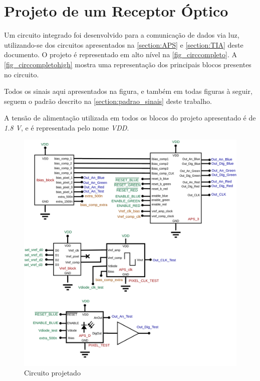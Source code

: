 \section[Projeto de um Receptor Óptico]{Projeto de um Receptor Óptico}
\label{sec_circ_comp}

Um circuito integrado foi desenvolvido para a comunicação de dados via luz, utilizando-se dos circuitos apresentados na \autoref{section:APS} e \autoref{section:TIA} deste documento. O projeto \'e representado em alto n\'ivel na \autoref{fig_circcompleto}. A \autoref{fig_circcompletohigh} mostra uma representação dos principais blocos presentes no circuito.

Todos os sinais aqui apresentados na figura, e tamb\'em em todas figuras \`a seguir, seguem o padrão descrito na \autoref{section:padrao_sinais} deste trabalho.

A tensão de alimentação utilizada em todos os blocos do projeto apresentado é de \textit{1.8 V}, e é representada pelo nome \textit{VDD}.

\begin{figure}[!h]
	\caption{\label{fig_circcompleto}Circuito projetado}
	\begin{center}
	    \includegraphics[width=\textwidth]{Circuitos/Complete_Circuit.png}
	\end{center}
\end{figure}

